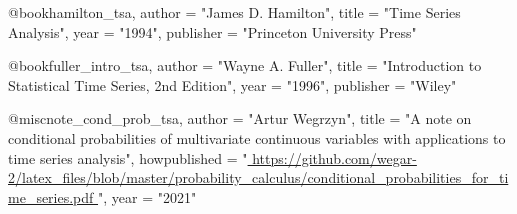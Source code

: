 @book{hamilton_tsa,
    author =       "James D. Hamilton",
    title =        "Time Series Analysis",
    year =         "1994",
    publisher =	   "Princeton University Press"
}

@book{fuller_intro_tsa,
    author =       "Wayne A. Fuller",
    title =        "Introduction to Statistical Time Series, 2nd Edition",
    year =         "1996",
    publisher =	   "Wiley"
}

@misc{note_cond_prob_tsa,
    author =       "Artur Wegrzyn",
    title =        "A note on conditional probabilities of multivariate continuous
				    variables with applications to time series analysis",
    howpublished = "\url{
    	https://github.com/wegar-2/latex_files/blob/master/probability_calculus/conditional_probabilities_for_time_series.pdf
    }",
    year =         "2021"
}